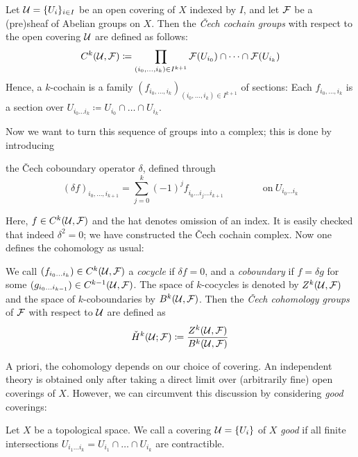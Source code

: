 \documentclass[parskip=half]{scrartcl}
\begin{document}
\begin{onboard}
\begin{mydef}
	Let $\mathcal{U}=\{U_i\}_{i\in I}$ be an open covering of $X$ indexed by $I$, and let $\mathcal{F}$ be a (pre)sheaf of Abelian groups on $X$. Then the \emph{\v{C}ech cochain groups} with respect to the open covering $\mathcal{U}$ are defined as follows:
	\begin{equation*}
		C^k(\mathcal{U},\mathcal{F})\coloneqq \prod_{(i_0,\dots,i_k)\in I^{k+1}} \mathcal{F}(U_{i_0})\cap\dots \cap \mathcal{F}(U_{i_k})
	\end{equation*}
	Hence, a $k$-cochain is a family $(f_{i_0,\dots,i_k})_{(i_0,\dots,i_k)\in I^{k+1}}$ of sections: Each $f_{i_0,\dots,i_k}$ is a section over $U_{i_0\dots i_k}\coloneqq U_{i_0}\cap\dots\cap U_{i_k}$.
\end{mydef}
\end{onboard}
Now we want to turn this sequence of groups into a complex; this is done by introducing 
\begin{onboard}
the \v{C}ech coboundary operator $\delta$, defined through
\begin{equation*}
	(\delta f)_{i_0,\dots,i_{k+1}}=\sum_{j=0}^k (-1)^j f_{i_0\dots \hat i_j\dots i_{k+1}} 
	\qquad \qquad \text{on}\ U_{i_0\dots i_k}
\end{equation*}
\end{onboard}
Here, $f\in C^k(\mathcal{U},\mathcal{F})$ and the hat denotes omission of an index. It is easily checked that indeed $\delta^2=0$; we have constructed the \v{C}ech cochain complex. Now one defines the cohomology as usual:

\begin{onboard}
\begin{mydef}
	We call $(f_{i_0\dots i_k})\in C^k(\mathcal{U},\mathcal{F})$ a \emph{cocycle} if $\delta f=0$, and a \emph{coboundary} if $f=\delta g$ for some $(g_{i_0\dots i_{k-1}})\in C^{k-1}(\mathcal{U},\mathcal{F})$. The space of $k$-cocycles is denoted by $Z^k(\mathcal{U},\mathcal{F})$ and the space of $k$-coboundaries by $B^k(\mathcal{U},\mathcal{F})$. Then the \emph{\v{C}ech cohomology groups} of $\mathcal{F}$ with respect to $\mathcal{U}$ are defined as
	\begin{equation*}
		\check H^k(\mathcal{U};\mathcal{F})\coloneqq \frac{Z^k(\mathcal{U},\mathcal{F})}{B^k(\mathcal{U},\mathcal{F})}
	\end{equation*}
\end{mydef}
\end{onboard}

\begin{onboard}
A priori, the cohomology depends on our choice of covering. An independent theory is obtained only after taking a direct limit over (arbitrarily fine) open coverings of $X$. However, we can circumvent this discussion by considering \emph{good} coverings:

\begin{mydef}
	Let $X$ be a topological space. We call a covering $\mathcal{U}=\{U_i\}$ of $X$ \emph{good} if all finite intersections $U_{i_1\dots i_k}=U_{i_1}\cap\dots\cap U_{i_k}$ are contractible.
\end{mydef}
\end{onboard}
\end{document}
